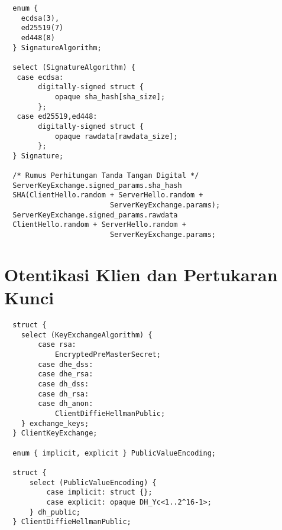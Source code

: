 \begin{verbatim}
  enum {
    ecdsa(3),
    ed25519(7)
    ed448(8)
  } SignatureAlgorithm;

  select (SignatureAlgorithm) {
   case ecdsa:
        digitally-signed struct {
            opaque sha_hash[sha_size];
        };
   case ed25519,ed448:
        digitally-signed struct {
            opaque rawdata[rawdata_size];
        };
  } Signature;

  /* Rumus Perhitungan Tanda Tangan Digital */
  ServerKeyExchange.signed_params.sha_hash
  SHA(ClientHello.random + ServerHello.random +
                         ServerKeyExchange.params);
  ServerKeyExchange.signed_params.rawdata
  ClientHello.random + ServerHello.random +
                         ServerKeyExchange.params;

\end{verbatim}

\section{Otentikasi Klien dan Pertukaran Kunci}

\begin{verbatim}
  struct {
    select (KeyExchangeAlgorithm) {
        case rsa:
            EncryptedPreMasterSecret;
        case dhe_dss:
        case dhe_rsa:
        case dh_dss:
        case dh_rsa:
        case dh_anon:
            ClientDiffieHellmanPublic;
    } exchange_keys;
  } ClientKeyExchange;

  enum { implicit, explicit } PublicValueEncoding;

  struct {
      select (PublicValueEncoding) {
          case implicit: struct {};
          case explicit: opaque DH_Yc<1..2^16-1>;
      } dh_public;
  } ClientDiffieHellmanPublic;


\end{verbatim}